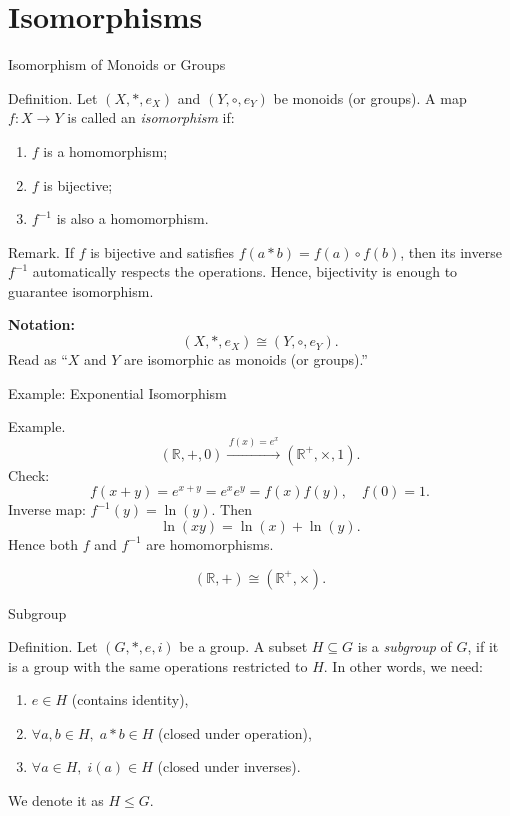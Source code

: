 \section{Isomorphisms}

\begin{frame}{Isomorphism of Monoids or Groups}
\vspace{-0.3cm}
\begin{block}{Definition.}
Let $(X, *, e_X)$ and $(Y, \circ, e_Y)$ be monoids (or groups).
A map \(f:X\to Y\) is called an \emph{isomorphism} if:
\begin{enumerate}
    \item \(f\) is a homomorphism;
    \item \(f\) is bijective;
    \item \(f^{-1}\) is also a homomorphism.
\end{enumerate}
\end{block}
\vspace{-0.3cm}
\begin{block}{Remark.}
If \(f\) is bijective and satisfies \(f(a*b)=f(a)\circ f(b)\), then its inverse \(f^{-1}\) automatically respects the operations.
Hence, bijectivity is enough to guarantee isomorphism.

\textbf{Notation:}
\[
(X, *, e_X) \cong (Y, \circ, e_Y).
\]
Read as “\(X\) and \(Y\) are isomorphic as monoids (or groups).”
\end{block}
\end{frame}

\begin{frame}{Example: Exponential Isomorphism}
\vspace{-0.3cm}
\begin{block}{Example.}
\[
(\mathbb{R}, +, 0) \xrightarrow{\,f(x)=e^x\,} (\mathbb{R}^+, \times, 1).
\]
Check:
\[
f(x+y)=e^{x+y}=e^x e^y=f(x)f(y),\quad f(0)=1.
\]
Inverse map: \(f^{-1}(y)=\ln(y)\).
Then
\[
\ln(xy)=\ln(x)+\ln(y).
\]
Hence both \(f\) and \(f^{-1}\) are homomorphisms.

\[
(\mathbb{R}, +) \cong (\mathbb{R}^+, \times).
\]
\end{block}
\end{frame}


\begin{frame}{Subgroup}
\begin{block}{Definition.}
Let $(G, *, e, i)$ be a group. A subset \(H \subseteq G\) is a \emph{subgroup} of \(G\), if it is a group with the same operations restricted to $H$. In other words, we need:

\begin{enumerate}
  \item \(e \in H\) \hfill (contains identity),
  \item \(\forall a,b \in H,\; a*b \in H\) \hfill (closed under operation),
  \item \(\forall a \in H,\; i(a) \in H\) \hfill (closed under inverses).
\end{enumerate}

We denote it as \(H \leq G.\)
\end{block}
\end{frame}

